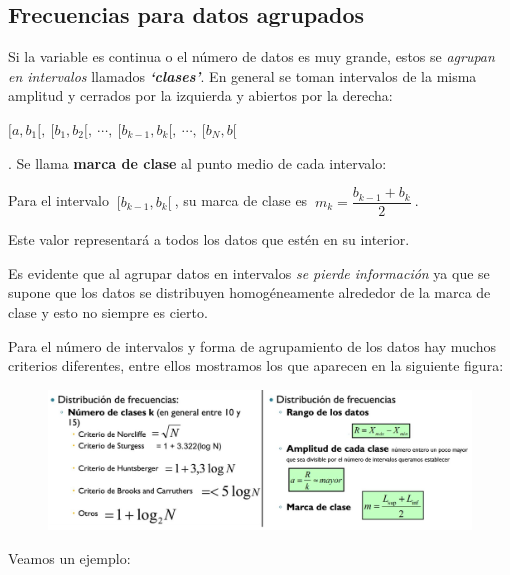 \subsection{Frecuencias para datos agrupados}

Si la variable es continua o el número de datos es muy grande, estos se \emph{agrupan en intervalos} llamados \textbf{\emph{`clases'}}. En general se toman intervalos de la misma amplitud y cerrados por la izquierda y abiertos por la derecha:

$[a,b_1[,\ [b_1,b_2[,\ \cdots ,\ [b_{k-1},b_k[,\ \cdots ,\ [b_N,b[$

\vspace{5mm}%
\begin{definition}.
		Se llama \textbf{marca de clase} al punto medio de cada intervalo:
		
		Para el intervalo $\ [b_{k-1},b_k[\ $, su marca de clase es $\ m_k=\dfrac{b_{k-1}+b_k}{2}\ $.
		
		\vspace{2mm} Este valor representará a todos los datos que estén en su interior.
		
		\vspace{2mm} Es evidente que al agrupar datos en intervalos \emph{se pierde información} ya que se supone que los datos se distribuyen homogéneamente alrededor de la marca de clase y esto no siempre es cierto.
\end{definition}

Para el número de intervalos y forma de agrupamiento de los datos hay muchos criterios diferentes, entre ellos mostramos los que aparecen en la siguiente figura:


		\begin{figure}[H]
			\centering
			\includegraphics[width=1.05\textwidth]{imagenes/imagenes01/T01IM01.png}
		\end{figure}

Veamos un ejemplo:

